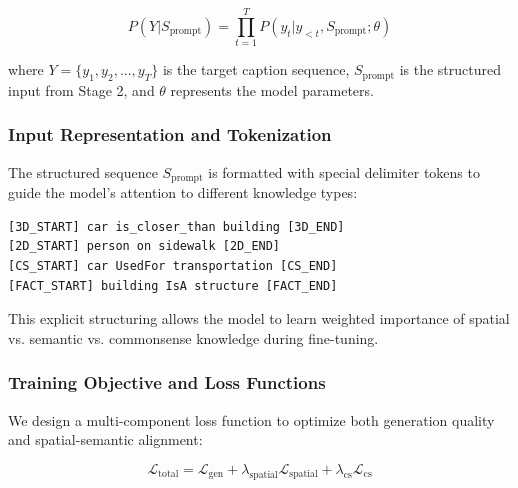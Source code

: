 \documentclass[runningheads,14pt]{llncs}
\begin{document}
\begin{equation}
P(Y|S_{\text{prompt}}) = \prod_{t=1}^{T} P(y_t | y_{<t}, S_{\text{prompt}}; \theta)
\end{equation}

where $Y = \{y_1, y_2, ..., y_T\}$ is the target caption sequence, $S_{\text{prompt}}$ is the structured input from Stage 2, and $\theta$ represents the model parameters.

\subsubsection{Input Representation and Tokenization}

The structured sequence $S_{\text{prompt}}$ is formatted with special delimiter tokens to guide the model's attention to different knowledge types:

\begin{verbatim}
[3D_START] car is_closer_than building [3D_END]
[2D_START] person on sidewalk [2D_END]
[CS_START] car UsedFor transportation [CS_END]
[FACT_START] building IsA structure [FACT_END]
\end{verbatim}

This explicit structuring allows the model to learn weighted importance of spatial vs. semantic vs. commonsense knowledge during fine-tuning.

\subsubsection{Training Objective and Loss Functions}

We design a multi-component loss function to optimize both generation quality and spatial-semantic alignment:

\begin{equation}
\mathcal{L}_{\text{total}} = \mathcal{L}_{\text{gen}} + \lambda_{\text{spatial}} \mathcal{L}_{\text{spatial}} + \lambda_{\text{cs}} \mathcal{L}_{\text{cs}}
\end{equation}
\end{document}
